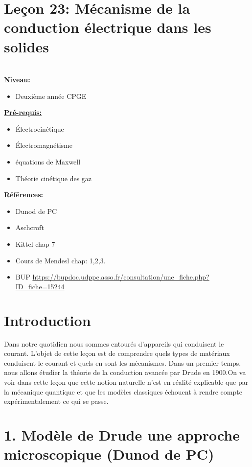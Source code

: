 \documentclass[french, a4paper, 10pt, twocolumn, landscape]{article}
\begin{document}
\section*{Leçon 23: Mécanisme de la conduction électrique dans les solides}

\hrulefill\\

\noindent\underline{\textbf{Niveau:}} 
\begin{itemize}
    \item Deuxième année CPGE
\end{itemize}

\noindent\underline{\textbf{Pré-requis:}}
\begin{itemize}
    \item Électrocinétique
    \item Électromagnétisme
    \item équations de Maxwell
    \item Théorie cinétique des gaz
\end{itemize}

\noindent\underline{\textbf{Références:}}

\begin{itemize}
\item Dunod de PC
\item Aschcroft
\item Kittel chap 7
\item Cours de Mendesl chap: 1,2,3.
\item BUP \url{https://bupdoc.udppc.asso.fr/consultation/une_fiche.php?ID_fiche=15244}
\end{itemize}

\hrulefill

\section*{Introduction}

Dans notre quotidien nous sommes entourés d'appareils qui conduisent le courant. L'objet de cette leçon est de comprendre quels types de matériaux conduisent le courant et quels en sont les mécanismes. Dans un premier temps, nous allons étudier la théorie de la conduction avancée par Drude en 1900.On va voir dans cette leçon que cette notion naturelle n’est en réalité explicable que par
la mécanique quantique et que les modèles classiques échouent à rendre compte expérimentalement ce qui se passe.

\section*{1. Modèle de Drude une approche microscopique (Dunod de PC)}
\end{document}
